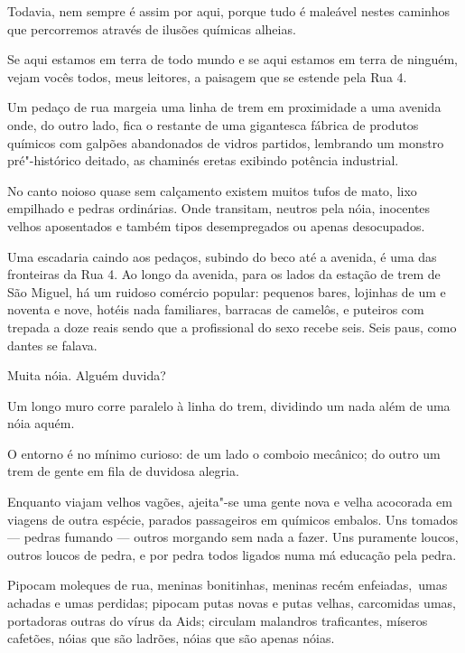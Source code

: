 Todavia, nem sempre é assim por aqui, porque tudo é maleável nestes
caminhos que percorremos através de ilusões químicas alheias.

\asterisc{}

Se aqui estamos em terra de todo mundo e se aqui estamos em terra de
ninguém, vejam vocês todos, meus leitores, a paisagem que se estende
pela Rua 4.

Um pedaço de rua margeia uma linha de trem em proximidade a uma avenida
onde, do outro lado, fica o restante de uma gigantesca fábrica de
produtos químicos com galpões abandonados de vidros partidos, lembrando
um monstro pré"-histórico deitado, as chaminés eretas exibindo potência
industrial.

No canto noioso quase sem calçamento existem muitos tufos de mato, lixo
empilhado e pedras ordinárias. Onde transitam, neutros pela nóia,
inocentes velhos aposentados e também tipos desempregados ou apenas
desocupados.

Uma escadaria caindo aos pedaços, subindo do beco até a avenida, é uma
das fronteiras da Rua 4. Ao longo da avenida, para os lados da estação
de trem de São Miguel, há um ruidoso comércio popular: pequenos bares,
lojinhas de um e noventa e nove, hotéis nada familiares, barracas de
camelôs, e puteiros com trepada a doze reais sendo que a profissional do
sexo recebe seis. Seis paus, como dantes se falava.

Muita nóia. Alguém duvida?

\asterisc{}

Um longo muro corre paralelo à linha do trem, dividindo um nada além de
uma nóia aquém.

O entorno é no mínimo curioso: de um lado o comboio mecânico; do outro
um trem de gente em fila de duvidosa alegria.

Enquanto viajam velhos vagões, ajeita"-se uma gente nova e velha
acocorada em viagens de outra espécie, parados passageiros em químicos
embalos. Uns tomados --- pedras fumando --- outros morgando sem nada a
fazer. Uns puramente loucos, outros loucos de pedra, e por pedra todos
ligados numa má educação pela pedra.

\asterisc{}

Pipocam moleques de rua, meninas bonitinhas, meninas recém
enfeiadas,~umas achadas e umas perdidas; pipocam putas novas e putas
velhas, carcomidas umas, portadoras outras do vírus da Aids; circulam
malandros traficantes, míseros cafetões, nóias que são ladrões, nóias
que são apenas nóias.

